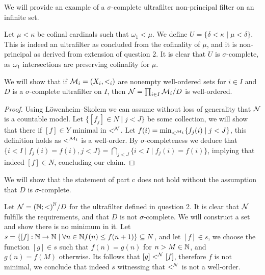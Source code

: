 \subquestion{}
We will provide an example of a $\sigma$-complete ultrafilter non-principal filter on an infinite set.
\begin{solution}
	Let $\mu < \kappa$ be cofinal cardinals such that $\omega_1 < \mu$.
	We define $U = \{ \delta < \kappa \mid \mu < \delta \}$.
	This is indeed an ultrafilter as concluded from the cofinality of $\mu$, and it is non-principal as derived from extension of question 2.
	It is clear that $U$ is $\sigma$-complete, as $\omega_1$ intersections are preserving cofinality for $\mu$.
\end{solution}

\subquestion{}
We will show that if $\mathcal{M}_i = (X_i, <_i)$ are nonempty well-ordered sets for $i \in I$ and $D$ is a $\sigma$-complete ultrafilter on $I$, then $\mathcal{N} = \prod_{i \in I} \mathcal{M}_i / D$ is well-ordered.
\begin{proof}
	Using Löwenheim–Skolem we can assume without loss of generality that $\mathcal{N}$ is a countable model.
	Let $\{ [f_j] \in N \mid j < J \}$ be some collection, we will show that there if $[f] \in Y$ minimal in $<^{\mathcal{N}}$.
	Let $f(i) = \min_{<^{\mathcal{M}_i}} \{ f_j(i) \mid j < J \}$, this definition holds as $<^{\mathcal{M}_i}$ is a well-order.
	By $\sigma$-completeness we deduce that $\{ i < I \mid f_j(i) = f(i), j < J \} = \bigcap_{j < J} \{ i < I \mid f_j(i) = f(i) \}$,
	implying that indeed $[f] \in N$, concluding our claim.
\end{proof}

\subquestion{}
We will show that the statement of part c does not hold without the assumption that $D$ is $\sigma$-complete.
\begin{solution}
	Let $\mathcal{N} = {(\mathbb{N}; <)}^{\mathbb{N}} / D$ for the ultrafilter defined in question 2.
	It is clear that $\mathcal{N}$ fulfills the requirements, and that $D$ is not $\sigma$-complete.
	We will construct a set and show there is no minimum in it.
	Let $s = \{ [f] : \mathbb{N} \to \mathbb{N} \mid \forall n \in \mathbb{N} f(n) \le f(n + 1) \} \subseteq N$, and let $[f] \in s$, we choose the function $[g] \in s$ such that $f(n) = g(n)$ for $n > M \in \mathbb{N}$, and $g(n) = f(M)$ otherwise.
	Its follows that $[g] <^{\mathcal{N}} [f]$, therefore $f$ is not minimal, we conclude that indeed $s$ witnessing that $<^{\mathcal{N}}$ is not a well-order.
\end{solution}


